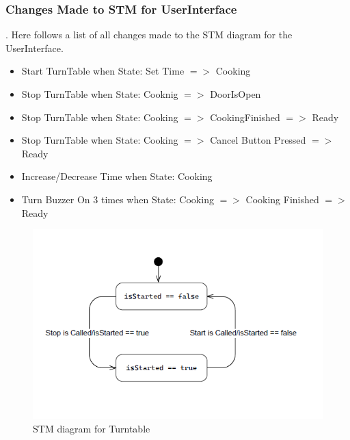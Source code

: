 \subsubsection{Changes Made to STM for UserInterface}.
Here follows a list of all changes made to the STM diagram for the UserInterface.

\begin{itemize}
  \item Start TurnTable when State: Set Time $=>$ Cooking
  \item Stop TurnTable when State: Cooknig $=>$ DoorIsOpen
  \item Stop TurnTable when State: Cooking $=>$ CookingFinished $=>$ Ready
  \item Stop TurnTable when State: Cooking $=>$ Cancel Button Pressed $=>$ Ready
  \item Increase/Decrease Time when State: Cooking
  \item Turn Buzzer On 3 times when State: Cooking $=>$ Cooking Finished $=>$ Ready 
\end{itemize}

\begin{figure}[h]
  \centering
  \includegraphics[scale=0.6]{02-Body/Image/TurntableSTM.PNG}
  \caption{STM diagram for Turntable}%
  \label{fig:TurntableSTM}
\end{figure}

